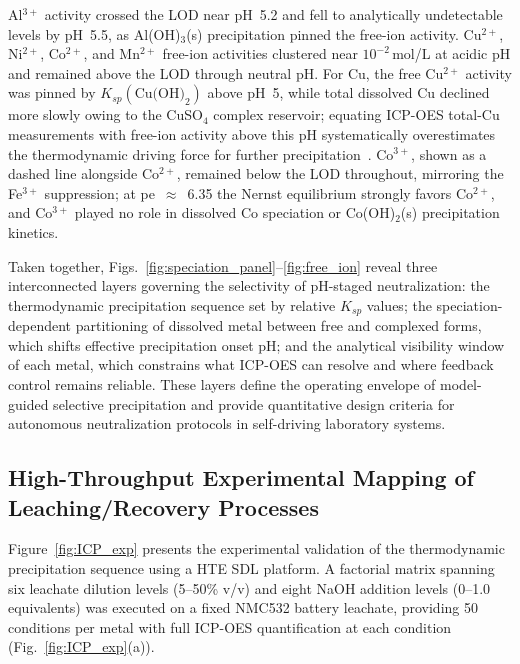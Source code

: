 \documentclass[final,2p,times]{elsarticle}
\begin{document}
Al$^{3+}$ activity crossed the LOD near pH~5.2 and fell to analytically undetectable levels by pH~5.5, as Al(OH)$_3$(s) precipitation pinned the free-ion activity. Cu$^{2+}$, Ni$^{2+}$, Co$^{2+}$, and Mn$^{2+}$ free-ion activities clustered near $10^{-2}$\,mol/L at acidic pH and remained above the LOD through neutral pH. For Cu, the free Cu$^{2+}$ activity was pinned by $K_{sp}(\text{Cu(OH)}_2)$ above pH~5, while total dissolved Cu declined more slowly owing to the CuSO$_4$ complex reservoir; equating ICP-OES total-Cu measurements with free-ion activity above this pH systematically overestimates the thermodynamic driving force for further precipitation~\cite{crundwell_extractive_2011, stumm_aquatic_1996}. Co$^{3+}$, shown as a dashed line alongside Co$^{2+}$, remained below the LOD throughout, mirroring the Fe$^{3+}$ suppression; at pe~$\approx$~6.35 the Nernst equilibrium strongly favors Co$^{2+}$, and Co$^{3+}$ played no role in dissolved Co speciation or Co(OH)$_2$(s) precipitation kinetics.

Taken together, Figs.~\ref{fig:speciation_panel}--\ref{fig:free_ion} reveal three interconnected layers governing the selectivity of pH-staged neutralization: the thermodynamic precipitation sequence set by relative $K_{sp}$ values; the speciation-dependent partitioning of dissolved metal between free and complexed forms, which shifts effective precipitation onset pH; and the analytical visibility window of each metal, which constrains what ICP-OES can resolve and where feedback control remains reliable. These layers define the operating envelope of model-guided selective precipitation and provide quantitative design criteria for autonomous neutralization protocols in self-driving laboratory systems.


\subsection{High-Throughput Experimental Mapping of Leaching/Recovery Processes}

Figure~\ref{fig:ICP_exp} presents the experimental validation of the thermodynamic precipitation sequence using a HTE SDL platform. A factorial matrix spanning six leachate dilution levels (5--50\% v/v) and eight NaOH addition levels (0--1.0 equivalents) was executed on a fixed NMC532 battery leachate, providing 50 conditions per metal with full ICP-OES quantification at each condition (Fig.~\ref{fig:ICP_exp}(a)).
\end{document}
